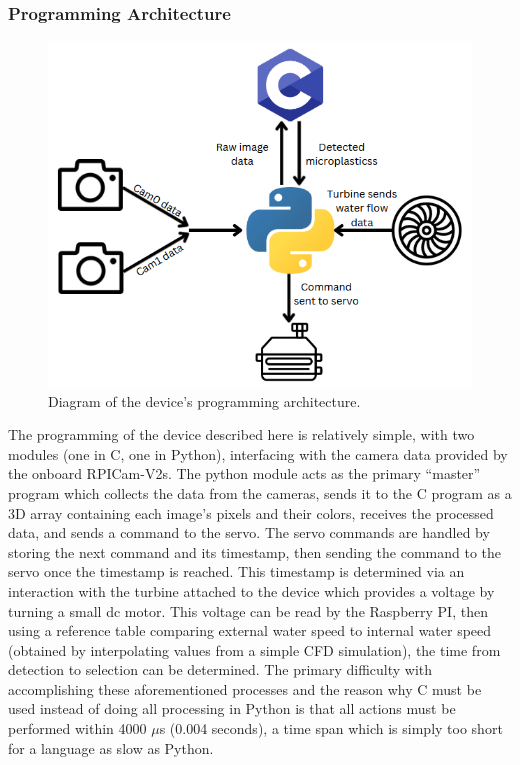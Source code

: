 \documentclass[fleqn,10pt]{SelfArx} %
\begin{document}
	
	\subsubsection{Programming Architecture}\label{sec:programmingArch}
	\begin{figure}[h]
		\centering
		\includegraphics[width=1\linewidth]{Figures/ProgrammingArch}
		\caption[Programming Architecture Diagram]{Diagram of the device's programming architecture.}
		\label{fig:ProgArch}
	\end{figure} 
	The programming of the device described here is relatively simple, with two modules (one in C, one in Python), interfacing with the camera data provided by the onboard RPICam-V2s. The python module acts as the primary “master” program which collects the data from the cameras, sends it to the C program as a 3D array containing each image’s pixels and their colors, receives the processed data, and sends a command to the servo. The servo commands are handled by storing the next command and its timestamp, then sending the command to the servo once the timestamp is reached. This timestamp is determined via an interaction with the turbine attached to the device which provides a voltage by turning a small dc motor. This voltage can be read by the Raspberry PI, then using a reference table comparing external water speed to internal water speed (obtained by interpolating values from a simple CFD simulation), the time from detection to selection can be determined. The primary difficulty with accomplishing these aforementioned processes and the reason why C must be used instead of doing all processing in Python is that all actions must be performed within 4000 $\mu$s (0.004 seconds), a time span which is simply too short for a language as slow as Python. 
	
\end{document}
